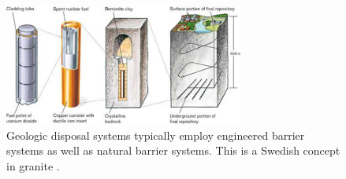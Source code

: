 \begin{figure}[htbp!]
  \begin{center}
    \includegraphics[width=0.7\textwidth]{skb_components.eps}
  \end{center}
  \caption{Geologic disposal systems typically employ engineered barrier 
    systems as well as natural barrier systems. This is a Swedish concept in 
    granite \cite{ab_long-term_2006}.}
  \label{fig:skb_components}
\end{figure}

